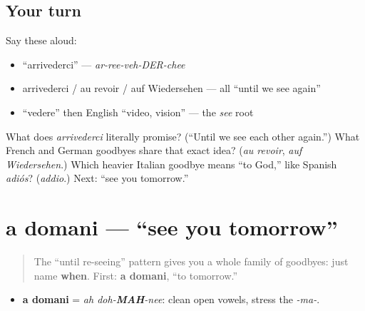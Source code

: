 \subsection*{Your turn}
Say these aloud:

\begin{itemize}
\raggedright
  \item \textquotedblleft{}arrivederci\textquotedblright{} — \emph{ar-ree-veh-DER-chee}
  \item arrivederci / au revoir / auf Wiedersehen — all \textquotedblleft{}until we see again\textquotedblright{}
  \item \textquotedblleft{}vedere\textquotedblright{} then English \textquotedblleft{}video, vision\textquotedblright{} — the \emph{see} root
\end{itemize}

\begin{tcolorbox}[breakable,colback=teal!4,colframe=teal!35!black,title={Before you move on}]
What does \emph{arrivederci} literally promise? (\textquotedblleft{}Until we see each other again.\textquotedblright{}) What French and German goodbyes share that exact idea? (\emph{au revoir}, \emph{auf Wiedersehen}.) Which heavier Italian goodbye means \textquotedblleft{}to God,\textquotedblright{} like Spanish \emph{adiós}? (\emph{addio}.) Next: \textquotedblleft{}see you tomorrow.\textquotedblright{}
\end{tcolorbox}
\section[a domani]{a domani — \textquotedblleft{}see you tomorrow\textquotedblright{}}

\label{lesson:IT-C04-a-domani}



\begin{quote}
The \textquotedblleft{}until re-seeing\textquotedblright{} pattern gives you a whole family of goodbyes: just name \textbf{when}. First: \textbf{a domani}, \textquotedblleft{}to tomorrow.\textquotedblright{}
\end{quote}

\begin{sounds}
\begin{itemize}
\raggedright
  \item \textbf{a domani} = \emph{ah doh-\textbf{MAH}-nee}: clean open vowels, stress the \emph{-ma-}.
\end{itemize}
\end{sounds}


